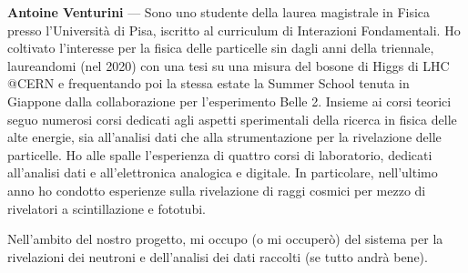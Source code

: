 \documentclass[twocolumn, a4paper]{article}
\newenvironment{crewbio}[1]{\noindent\textbf{#1} ---}{\\}
\begin{document}
\begin{crewbio}{Antoine Venturini}
Sono uno studente della laurea magistrale in Fisica presso l'Università di Pisa, iscritto al curriculum di Interazioni Fondamentali. Ho coltivato l'interesse per la fisica delle particelle sin dagli anni della triennale, laureandomi (nel 2020) con una tesi su una misura del bosone di Higgs di LHC @CERN e frequentando poi la stessa estate la Summer School tenuta in Giappone dalla collaborazione per l'esperimento Belle 2.  
Insieme ai corsi teorici seguo numerosi corsi dedicati agli aspetti sperimentali della ricerca in fisica delle alte energie, sia all'analisi dati che alla strumentazione per la rivelazione delle particelle.
Ho alle spalle l'esperienza di quattro corsi di laboratorio, dedicati all'analisi dati e all'elettronica analogica e digitale. In particolare, nell'ultimo anno ho condotto esperienze sulla rivelazione di raggi cosmici per mezzo di rivelatori a scintillazione e fototubi. 

Nell'ambito del nostro progetto, mi occupo (o mi occuperò) del sistema per la rivelazioni dei neutroni e dell'analisi dei dati raccolti (se tutto andrà bene). 
\end{crewbio}
\end{document}
